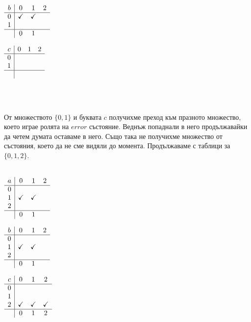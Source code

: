 \documentclass[12pt]{article}
\begin{document}
\begin{minipage}{.33\textwidth}
\centering
\(\begin{array}{c|ccc}
b & 0 & 1 & 2 \\ \hline
0 & \checkmark & \checkmark & \\
1 &  &  & \\ \hline
  & 0 & 1 & 
\end{array}\)
\end{minipage}
\begin{minipage}{.33\textwidth}
\centering
\(\begin{array}{c|ccc}
c & 0 & 1 & 2 \\ \hline
0 & & & \\
1 & & & \\ \hline
  & & &
\end{array}\)
\end{minipage}
\\
\vspace*{5mm}
\\\par
От множеството \(\{0, 1\}\) и буквата \(c\) получихме преход към празното множество,
което играе ролята на \(error\) състояние.
Веднъж попаднали в него продължавайки да четем думата оставаме в него.
Също така не получихме множество от състояния, което да не сме видяли до момента.
Продължаваме с таблици за \(\{0, 1, 2\}\).
\\
\vspace*{5mm}
\\
\begin{minipage}{.33\textwidth}
\centering
\(\begin{array}{c|ccc}
a & 0 & 1 & 2 \\ \hline
0 &   &   & \\
1 & \checkmark & \checkmark & \\
2 &  &  & \\ \hline
  & 0 & 1 &
\end{array}\)
\end{minipage}
\begin{minipage}{.33\textwidth}
\centering
\(\begin{array}{c|ccc}
b & 0 & 1 & 2 \\ \hline
0 &   &   & \\
1 & \checkmark & \checkmark & \\
2 &  &  & \\ \hline
  & 0 & 1 &
\end{array}\)
\end{minipage}
\begin{minipage}{.33\textwidth}
\centering
\(\begin{array}{c|ccc}
c & 0 & 1 & 2 \\ \hline
0 &   &   & \\
1 &   &   &\\
2 & \checkmark & \checkmark & \checkmark \\ \hline
  & 0 & 1 & 2
\end{array}\)
\end{minipage}
\end{document}

